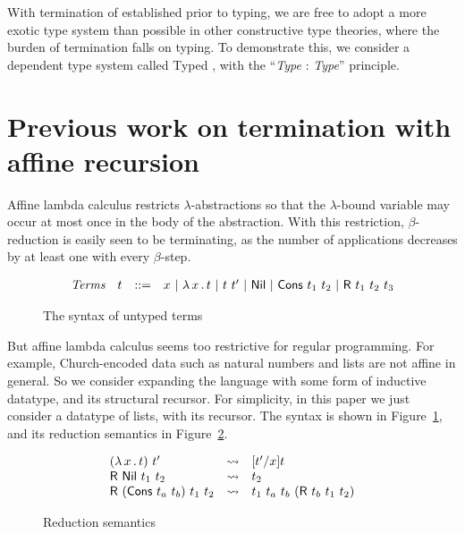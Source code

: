 \documentclass{article}
\begin{document}
With termination of \sar established prior to typing, we are free to
adopt a more exotic type system than possible in other constructive
type theories, where the burden of termination falls on typing.  To
demonstrate this, we consider a dependent type system called Typed
\sar, with the ``\textit{Type} : \textit{Type}'' principle.

\section{Previous work on termination with affine recursion}

Affine lambda calculus restricts $\lambda$-abstractions so that the
$\lambda$-bound variable may occur at most once in the body of the
abstraction.  With this restriction, $\beta$-reduction is easily seen
to be terminating, as the number of applications decreases by at least
one with every $\beta$-step.

\begin{figure}
  \[
  \begin{array}{llll}
    \textit{Terms} & t & ::= & x\ |\ \lam{x}{t}\ |\ t\ t'\ |\ \mathsf{Nil}\ |\ \mathsf{Cons}\ t_1\ t_2\ |\ \mathsf{R}\ t_1\ t_2\ t_3
  \end{array}
  \]
  \caption{The syntax of untyped terms}
\label{fig:syn}
\end{figure}

But affine lambda calculus seems too restrictive for regular
programming.  For example, Church-encoded data such as natural numbers
and lists are not affine in general.  So we consider expanding the
language with some form of inductive datatype, and its structural
recursor.  For simplicity, in this paper we just consider a datatype of lists, with its
recursor.  The syntax is shown in Figure~\ref{fig:syn}, and its reduction semantics in Figure~\ref{fig:redsem}.

\begin{figure}
  \[
  \begin{array}{llll}
    (\lambda\, x\, .\, t)\ t' & \leadsto & [t'/x]t \\
    \mathsf{R}\ \mathsf{Nil}\ t_1\ t_2 & \leadsto & t_2 \\
    \mathsf{R}\ (\mathsf{Cons}\ t_a\ t_b)\ t_1\ t_2 & \leadsto & t_1\ t_a\ t_b\ (\mathsf{R}\ t_b\ t_1\ t_2)
  \end{array}
  \]
  \caption{Reduction semantics}
\label{fig:redsem}
\end{figure}
\end{document}
